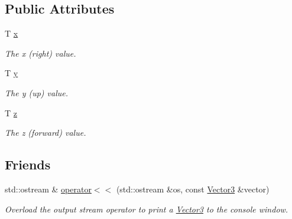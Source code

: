 \subsection*{Public Attributes}
\begin{DoxyCompactItemize}
\item 
T \hyperlink{classsparky_1_1_vector3_aaf08291c98a0e2c472afcdc1eb6e2947}{x}\hypertarget{classsparky_1_1_vector3_aaf08291c98a0e2c472afcdc1eb6e2947}{}\label{classsparky_1_1_vector3_aaf08291c98a0e2c472afcdc1eb6e2947}

\begin{DoxyCompactList}\small\item\em The x (right) value. \end{DoxyCompactList}\item 
T \hyperlink{classsparky_1_1_vector3_ad39b81dab4583e170eee844f1ed80b38}{y}\hypertarget{classsparky_1_1_vector3_ad39b81dab4583e170eee844f1ed80b38}{}\label{classsparky_1_1_vector3_ad39b81dab4583e170eee844f1ed80b38}

\begin{DoxyCompactList}\small\item\em The y (up) value. \end{DoxyCompactList}\item 
T \hyperlink{classsparky_1_1_vector3_ab784d68d4c4b9d799d1984ab06b802cf}{z}\hypertarget{classsparky_1_1_vector3_ab784d68d4c4b9d799d1984ab06b802cf}{}\label{classsparky_1_1_vector3_ab784d68d4c4b9d799d1984ab06b802cf}

\begin{DoxyCompactList}\small\item\em The z (forward) value. \end{DoxyCompactList}\end{DoxyCompactItemize}
\subsection*{Friends}
\begin{DoxyCompactItemize}
\item 
std\+::ostream \& \hyperlink{classsparky_1_1_vector3_a99d33e9522bf76d3a320969707f84168}{operator$<$$<$} (std\+::ostream \&os, const \hyperlink{classsparky_1_1_vector3}{Vector3} \&vector)
\begin{DoxyCompactList}\small\item\em Overload the output stream operator to print a \hyperlink{classsparky_1_1_vector3}{Vector3} to the console window. \end{DoxyCompactList}\end{DoxyCompactItemize}



